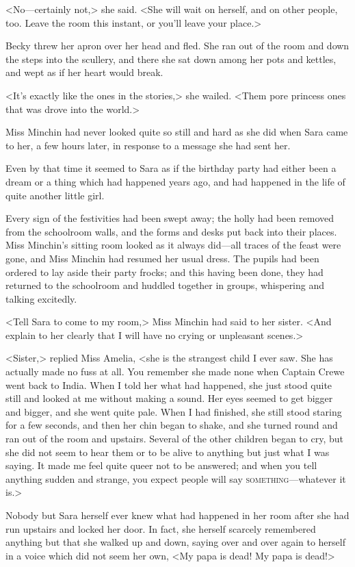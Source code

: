 <No—certainly not,> she said. <She will wait on herself, and on other people, too. Leave the room this instant, or you'll leave your place.>

Becky threw her apron over her head and fled. She ran out of the room and down the steps into the scullery, and there she sat down among her pots and kettles, and wept as if her heart would break.

<It's exactly like the ones in the stories,> she wailed. <Them pore princess ones that was drove into the world.>

Miss Minchin had never looked quite so still and hard as she did when Sara came to her, a few hours later, in response to a message she had sent her.

Even by that time it seemed to Sara as if the birthday party had either been a dream or a thing which had happened years ago, and had happened in the life of quite another little girl.

Every sign of the festivities had been swept away; the holly had been removed from the schoolroom walls, and the forms and desks put back into their places. Miss Minchin's sitting room looked as it always did—all traces of the feast were gone, and Miss Minchin had resumed her usual dress. The pupils had been ordered to lay aside their party frocks; and this having been done, they had returned to the schoolroom and huddled together in groups, whispering and talking excitedly.

<Tell Sara to come to my room,> Miss Minchin had said to her sister. <And explain to her clearly that I will have no crying or unpleasant scenes.>

<Sister,> replied Miss Amelia, <she is the strangest child I ever saw. She has actually made no fuss at all. You remember she made none when Captain Crewe went back to India. When I told her what had happened, she just stood quite still and looked at me without making a sound. Her eyes seemed to get bigger and bigger, and she went quite pale. When I had finished, she still stood staring for a few seconds, and then her chin began to shake, and she turned round and ran out of the room and upstairs. Several of the other children began to cry, but she did not seem to hear them or to be alive to anything but just what I was saying. It made me feel quite queer not to be answered; and when you tell anything sudden and strange, you expect people will say \textsc{something}—whatever it is.>

Nobody but Sara herself ever knew what had happened in her room after she had run upstairs and locked her door. In fact, she herself scarcely remembered anything but that she walked up and down, saying over and over again to herself in a voice which did not seem her own, <My papa is dead! My papa is dead!>

